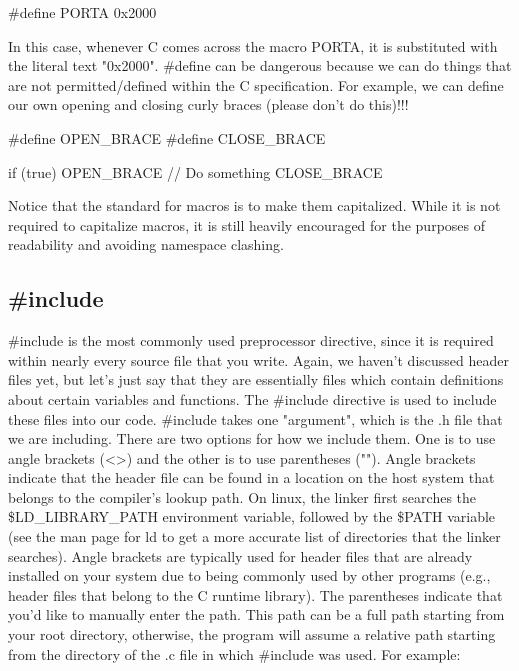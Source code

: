 \documentclass{article}
\begin{document}
\begin{cblk}
#define PORTA 0x2000
\end{cblk}

In this case, whenever C comes across the macro PORTA, it is substituted with the literal text "0x2000".
\#define can be dangerous because we can do things that are not permitted/defined within the C specification.
For example, we can define our own opening and closing curly braces (please don't do this)!!!

\begin{cblk}
#define OPEN_BRACE {
#define CLOSE_BRACE }

if (true) OPEN_BRACE
// Do something
CLOSE_BRACE
\end{cblk}

Notice that the standard for macros is to make them capitalized. While it is not required to capitalize
macros, it is still heavily encouraged for the purposes of readability and avoiding namespace clashing.

\subsection{\#include}

\#include is the most commonly used preprocessor directive, since it is required within nearly every source
file that you write. Again, we haven't discussed header files yet, but let's just say that they are essentially
files which contain definitions about certain variables and functions. The \#include directive is used to
include these files into our code. \#include takes one "argument", which is the .h file that we are including.
There are two options for how we include them. One is to use angle brackets (<>) and the other is to use
parentheses (""). Angle brackets indicate that the header file can be found in a location on the host system
that belongs to the compiler's lookup path. On linux, the linker first searches the \$LD\_LIBRARY\_PATH
environment variable, followed by the \$PATH variable (see the man page for ld to get a more accurate list of
directories that the linker searches). Angle brackets are typically used for header files that are already
installed on your system due to being commonly used by other programs (e.g., header files that belong to the C
runtime library). The parentheses indicate that you'd like to manually enter the path. This path can be a full
path starting from your root directory, otherwise, the program will assume a relative path starting from the
directory of the .c file in which \#include was used. For example:
\end{document}
